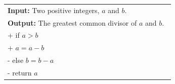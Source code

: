 \documentclass[12pt]{standalone}
\newcounter{levelstanda}
\begin{document}
\renewcommand{\arraystretch}{0}
\begin{tabular}{ @{}p{0.98\linewidth}@{} }%
        \textbf{Input:}  Two positive integers, $a$ and $b$.\\
        \textbf{Output:} The greatest common divisor of $a$ and $b$.
        \begin{pseudo}[label=\small\arabic*, indent-mark]
            while $a \neq b$ \ct{If equal, both are gcd} \\+
                if $a > b$ \ct{ Reduce max with multiple of min} \\+
                    $a = a - b$ \ct{ $a$ is largest} \\-
                else $b = b - a$ \ct{ $b$ is largest} \\-
            return $a$ \ct{ Both are gcd, so return one}
        \end{pseudo}
        The running time is quadratic in the number of bits in the input.
\end{tabular}
\addtocounter{levelstanda}{-1}
\end{document}
